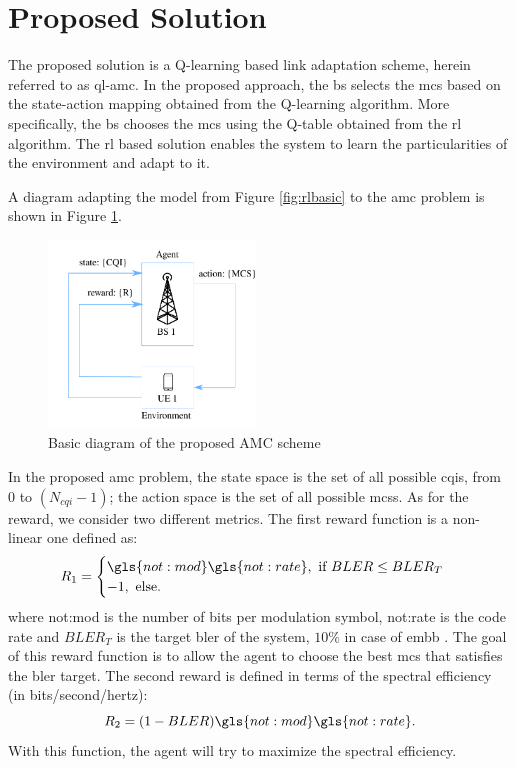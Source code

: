 
\section{Proposed Solution}

The proposed solution is a Q-learning based link adaptation scheme, herein referred to as \gls{ql-amc}.
%
In the proposed approach, the \gls{bs} selects the \gls{mcs} based on the state-action mapping obtained from the Q-learning algorithm.
%
More specifically, the \gls{bs} chooses the \gls{mcs} using the Q-table obtained from the \gls{rl} algorithm.
%
The \gls{rl} based solution enables the system to learn the particularities of the environment and adapt to it.

A diagram adapting the model from Figure \ref{fig:rlbasic} to the \gls{amc} problem is shown in Figure \ref{fig:amc-rl-frame}.
%
\begin{figure}[t]
\centerline{\includegraphics[width=55mm]{figures/chp_amc/rl-framework-mateus.pdf}}
\caption{Basic diagram of the proposed AMC scheme}
\label{fig:amc-rl-frame}
\end{figure}
%

In the proposed \gls{amc} problem, the state space is the set of all possible \gls{cqi}s, from $0$ to $(N_{cqi}-1)$; the action space is the set of all possible \gls{mcs}s. As for the reward, we consider two different metrics.
%
The first reward function is a non-linear one defined as:
\begin{equation}\label{eq.:rewardBler}
  R_1 = \begin{cases}
  \gls{not:mod} \gls{not:rate}, \text{ if } BLER \leq BLER_T \\
  -1, \text{ else.}
\end{cases}
\end{equation}
\noindent where \gls{not:mod} is the number of bits per modulation symbol, \gls{not:rate} is the code rate and $BLER_T$ is the target \gls{bler} of the system, $10\%$ in case of \gls{embb} \cite{3gpp.38.214}.
%
The goal of this reward function is to allow the agent to choose the best \gls{mcs} that satisfies the \gls{bler} target. The second reward is defined in terms of the spectral efficiency (in bits/second/hertz):
\begin{equation}\label{eq.:rewardSE}
    R_2 = (1-BLER) \gls{not:mod} \gls{not:rate} \text{.}
\end{equation}
\noindent With this function, the agent will try to maximize the spectral efficiency.




